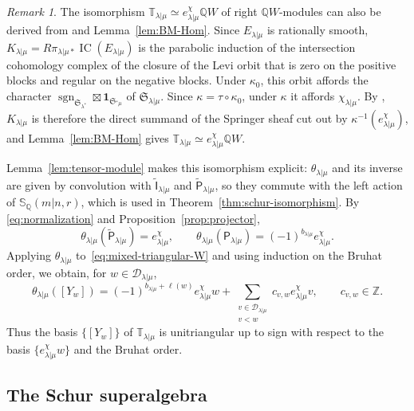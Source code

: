 \documentclass[11pt,a4paper]{amsart}
\theoremstyle{definition}
\theoremstyle{remark}
\newtheorem{remark}[theorem]{Remark}
\newcommand{\Q}{\mathbb Q}
\newcommand{\bS}{\mathbb S}
\newcommand{\bT}{\mathbb T}
\newcommand{\IC}{\operatorname{IC}}
\newcommand{\sgn}{\operatorname{sgn}}
\newcommand{\lm}{\lambda|\mu}
\numberwithin{equation}{section}
\begin{document}
\begin{remark}\label{rem:BM-tensor-module}
The isomorphism $\bT_{\lm}\simeq e_{\lm}^\chi\Q W$ of right $\Q W$-modules
can also be derived from \cite[Sections~2.12--2.13]{BM} and
Lemma~\ref{lem:BM-Hom}. Since $E_{\lm}$ is rationally smooth,
$K_{\lm}=R\pi_{\lm*}\IC(E_{\lm})$ is the parabolic induction of the
intersection cohomology complex of the closure of the Levi orbit that is
zero on the positive blocks and regular on the negative blocks. Under
$\kappa_0$, this orbit affords the character
$\sgn_{\mathfrak S_{\lambda^*}}\boxtimes\mathbf1_{\mathfrak S_{{}^*\mu}}$
of $\mathfrak S_{\lm}$. Since $\kappa=\tau\circ\kappa_0$, under $\kappa$ it
affords $\chi_{\lm}$. By \cite[Section~2.13(c),(e)]{BM}, $K_{\lm}$ is
therefore the direct summand of the Springer sheaf cut out by
$\kappa^{-1}(e_{\lm}^\chi)$, and Lemma~\ref{lem:BM-Hom} gives
$\bT_{\lm}\simeq e_{\lm}^\chi\Q W$.

Lemma~\ref{lem:tensor-module} makes this isomorphism explicit: $\theta_{\lm}$
and its inverse are given by convolution with
$\widetilde{\mathsf I}_{\lm}$ and $\widetilde{\mathsf P}_{\lm}$, so they
commute with the left action of $\bS_\Q(m|n,r)$, which is used in
Theorem~\ref{thm:schur-isomorphism}. By
\eqref{eq:normalization} and Proposition~\ref{prop:projector},
\begin{equation}\label{eq:images-refinement-generators}
\theta_{\lm}(\widetilde{\mathsf P}_{\lm})=e_{\lm}^{\chi},\qquad
\theta_{\lm}(\mathsf P_{\lm})=(-1)^{b_{\lm}}e_{\lm}^{\chi}.
\end{equation}
Applying $\theta_{\lm}$ to~\eqref{eq:mixed-triangular-W} and using
induction on the Bruhat order, we obtain, for $w\in\mathcal D_{\lm}$,
\begin{equation}\label{eq:images-component-basis}
\theta_{\lm}([Y_w])
=(-1)^{b_{\lm}+\ell(w)}e_{\lm}^{\chi}w
+\sum_{\substack{v\in\mathcal D_{\lm}\\v<w}}
 c_{v,w}e_{\lm}^{\chi}v,\qquad c_{v,w}\in\mathbb Z .
\end{equation}
Thus the basis $\{[Y_w]\}$ of $\bT_{\lm}$ is unitriangular up to sign
with respect to the basis $\{e_{\lm}^\chi w\}$ and the Bruhat order.
\end{remark}



\subsection{The Schur superalgebra}
\label{sec:algebra}
\end{document}
